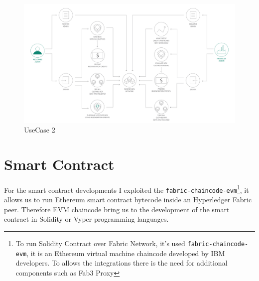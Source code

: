 \begin{figure}[h!]
	\centering
	\includegraphics[totalheight=10cm]{img/use_case2.png}
	\caption{UseCase 2}
	\label{fig:usecase2}
\end{figure}


\newpage
\section{Smart Contract}

For the smart contract developments I exploited the \texttt{fabric-chaincode-evm}\footnote{To run Solidity Contract over 
Fabric Network, it's used \texttt{fabric-chaincode-evm}\cite{evm-chaincode}, it is an Ethereum virtual machine chaincode developed by IBM 
developers. To allows the integrations there is the need for additional components such as Fab3 Proxy}, it allows us 
to run Ethereum smart contract bytecode inside an Hyperledger Fabric peer. Therefore EVM chaincode bring us to the 
development of the smart contract in Solidity or Vyper programming languages. 
\bigskip

